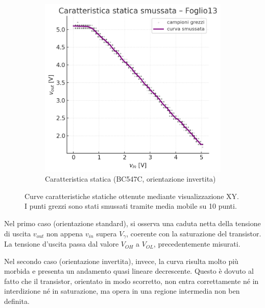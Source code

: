 \documentclass[a4paper,12pt]{article}
\begin{document}
\begin{figure}[H]
\begin{subfigure}{0.45\textwidth}
    \includegraphics[width=\linewidth]{caratteristica_inver.png}
    \caption{Caratteristica statica (BC547C, orientazione invertita)}
  \end{subfigure}
  \caption{Curve caratteristiche statiche ottenute mediante visualizzazione XY. I punti grezzi sono stati smussati tramite media mobile su 10 punti.}
\end{figure}

Nel primo caso (orientazione standard), si osserva una caduta netta della tensione di uscita \(v_{out}\) non appena \(v_{in}\) supera \(V_\gamma\), coerente con la saturazione del transistor. La tensione d’uscita passa dal valore $V_{OH}$ a $V_{OL}$, precedentemente misurati.

Nel secondo caso (orientazione invertita), invece, la curva risulta molto più morbida e presenta un andamento quasi lineare decrescente. Questo è dovuto al fatto che il transistor, orientato in modo scorretto, non entra correttamente né in interdizione né in saturazione, ma opera in una regione intermedia non ben definita.
\end{document}
